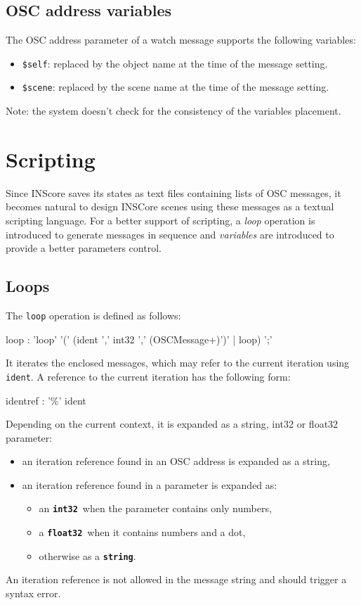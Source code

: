 \documentclass[a4paper,twoside]{report}
\newcommand{\toplevel}[1]	{\chapter{#1}}
\newcommand{\sublevel}[1]	{\section{#1}}
\newcommand{\OSC}[1]		{\texttt{#1}}
\newcommand{\osctype}[1]{\textbf{\texttt{{\small #1}}}}
\newcommand{\oscint}{\osctype{int32}}
\newcommand{\oscfloat}{\osctype{float32}}
\newcommand{\oscstring}{\osctype{string}}
\begin{document}
\sublevel{OSC address variables}
\label{oscvar}
The OSC address parameter of a watch message supports the following variables:
\begin{itemize}
\item \OSC{\$self}: replaced by the object name at the time of the message setting.
\item \OSC{\$scene}: replaced by the scene name at the time of the message setting.
\end{itemize}
Note: the system doesn't check for the consistency of the variables placement.

\toplevel{Scripting}\label{scripting}

Since INScore saves its states as text files containing lists of OSC messages, it becomes natural to design INSCore scenes using these messages as a textual scripting language. For a better support of scripting, a \emph{loop} operation is introduced to generate messages in sequence and \emph{variables} are introduced to provide a better parameters control.

\sublevel{Loops}\label{loops}

The \OSC{loop} operation is defined as follows:
\begin{rail} 
loop : 'loop' '(' (ident ',' int32 ',' (OSCMessage+)')' | loop) ';'
\end{rail}
It iterates the enclosed messages, which may refer to the current iteration using \OSC{ident}. A reference to the current iteration has the following form:
\begin{rail}
identref : '\%'  ident 
\end{rail}
Depending on the current context, it is expanded as a string, int32 or float32 parameter: 
\begin{itemize}
\item an iteration reference found in an OSC address is expanded as a string,
\item an iteration reference found in a parameter is expanded as:
\begin{itemize}
\item an \oscint\ when the parameter contains only numbers, 
\item a \oscfloat\ when it contains numbers and a dot,
\item otherwise as a \oscstring.
\end{itemize}
\end{itemize}
An iteration reference is not allowed in the message string and should trigger a syntax error.
\end{document}
